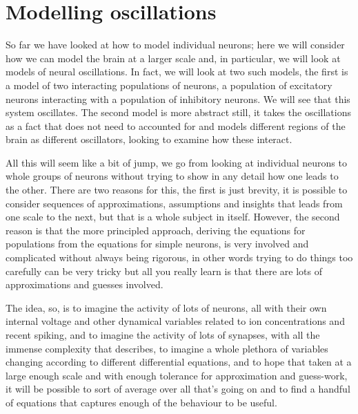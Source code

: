 \documentclass[11pt,a4paper]{scrartcl}
\begin{document}
\section*{Modelling oscillations}

So far we have looked at how to model individual neurons; here we will
consider how we can model the brain at a larger scale and, in
particular, we will look at models of neural oscillations. In fact, we
will look at two such models, the first is a model of two interacting
populations of neurons, a population of excitatory neurons interacting
with a population of inhibitory neurons. We will see that this system
oscillates. The second model is more abstract still, it takes the
oscillations as a fact that does not need to accounted for and models
different regions of the brain as different oscillators, looking to
examine how these interact.

All this will seem like a bit of jump, we go from looking at
individual neurons to whole groups of neurons without trying to show
in any detail how one leads to the other. There are two reasons for
this, the first is just brevity, it is possible to consider sequences
of approximations, assumptions and insights that leads from one scale
to the next, but that is a whole subject in itself. However, the
second reason is that the more principled approach, deriving the
equations for populations from the equations for simple neurons, is
very involved and complicated without always being rigorous, in other
words trying to do things too carefully can be very tricky but all you
really learn is that there are lots of approximations and guesses involved.

The idea, so, is to imagine the activity of lots of neurons, all with
their own internal voltage and other dynamical variables related to
ion concentrations and recent spiking, and to imagine the activity of
lots of synapses, with all the immense complexity that describes, to
imagine a whole plethora of variables changing according to different
differential equations, and to hope that taken at a large enough scale
and with enough tolerance for approximation and guess-work, it will be
possible to sort of average over all that's going on and to find a
handful of equations that captures enough of the behaviour to be
useful.
\end{document}
